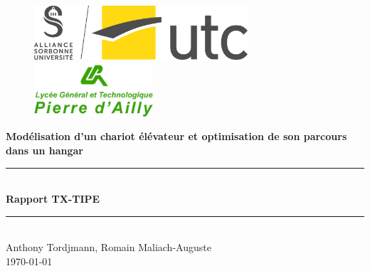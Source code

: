 \documentclass{report-UTC}
\begin{document}
\thispagestyle{empty}

\begin{figure}[h]
\centering
\includegraphics[height=2cm]{assets/logo_utc.jpg}
	\hspace{1cm}
\includegraphics[height=2cm]{assets/logo_dailly.png}
\end{figure}

\vspace{1.5cm}

\begin{center}
\huge{\textbf{Modélisation d'un chariot élévateur et optimisation de son parcours dans un hangar}} \\
\vspace{1cm}
\noindent\rule{10cm}{0.4pt} \\
\vspace{0.5cm}
\huge{\textbf{Rapport TX-TIPE}} \\
\vspace{0.5cm}
\noindent\rule{10cm}{0.4pt}  \\
\vspace{2cm}
\Large{Anthony Tordjmann, Romain Maliach-Auguste} \\
\vspace{1.5cm}
\Large{\today}
\end{center}

\renewcommand*\contentsname{Sommaire}

\clearpage

\tableofcontents\thispagestyle{empty}

\clearpage

\clearpage

\clearpage

\clearpage

\clearpage

\clearpage
\printbibliography 
\end{document}
